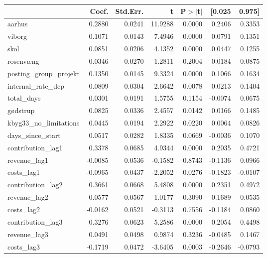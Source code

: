 \begin{table}
\begin{center}
\begin{tabular}{lrrrrrr}
\hline
                        &   Coef. & Std.Err. &       t & P$> |$t$|$ &  [0.025 &  0.975]  \\
\hline
aarhus                  &  0.2880 &   0.0241 & 11.9288 &      0.0000 &  0.2406 &  0.3353  \\
viborg                  &  0.1071 &   0.0143 &  7.4946 &      0.0000 &  0.0791 &  0.1351  \\
skol                    &  0.0851 &   0.0206 &  4.1352 &      0.0000 &  0.0447 &  0.1255  \\
rosenvæng               &  0.0346 &   0.0270 &  1.2811 &      0.2004 & -0.0184 &  0.0875  \\
posting\_group\_projekt &  0.1350 &   0.0145 &  9.3324 &      0.0000 &  0.1066 &  0.1634  \\
internal\_rate\_dep     &  0.0809 &   0.0304 &  2.6642 &      0.0078 &  0.0213 &  0.1404  \\
total\_days             &  0.0301 &   0.0191 &  1.5755 &      0.1154 & -0.0074 &  0.0675  \\
gødstrup                &  0.0825 &   0.0336 &  2.4557 &      0.0142 &  0.0166 &  0.1485  \\
kbyg33\_no\_limitations &  0.0445 &   0.0194 &  2.2922 &      0.0220 &  0.0064 &  0.0826  \\
days\_since\_start      &  0.0517 &   0.0282 &  1.8335 &      0.0669 & -0.0036 &  0.1070  \\
contribution\_lag1      &  0.3378 &   0.0685 &  4.9344 &      0.0000 &  0.2035 &  0.4721  \\
revenue\_lag1           & -0.0085 &   0.0536 & -0.1582 &      0.8743 & -0.1136 &  0.0966  \\
costs\_lag1             & -0.0965 &   0.0437 & -2.2052 &      0.0276 & -0.1823 & -0.0107  \\
contribution\_lag2      &  0.3661 &   0.0668 &  5.4808 &      0.0000 &  0.2351 &  0.4972  \\
revenue\_lag2           & -0.0577 &   0.0567 & -1.0177 &      0.3090 & -0.1689 &  0.0535  \\
costs\_lag2             & -0.0162 &   0.0521 & -0.3113 &      0.7556 & -0.1184 &  0.0860  \\
contribution\_lag3      &  0.3276 &   0.0623 &  5.2586 &      0.0000 &  0.2054 &  0.4498  \\
revenue\_lag3           &  0.0491 &   0.0498 &  0.9874 &      0.3236 & -0.0485 &  0.1467  \\
costs\_lag3             & -0.1719 &   0.0472 & -3.6405 &      0.0003 & -0.2646 & -0.0793  \\
\hline
\end{tabular}
\end{center}


\end{table}
